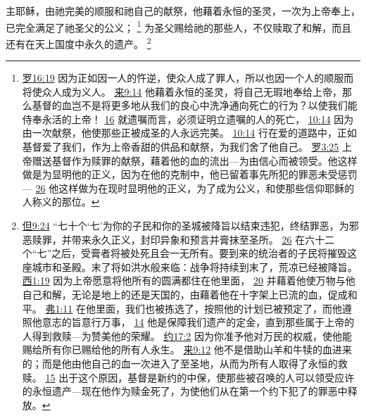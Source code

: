 \documentclass[12pt, a4paper, oneside]{ctexart}
\newcounter{parnum}[section]
\newcommand{\N}{%
   \noindent\refstepcounter{parnum}%
    \makebox[\parindent][l]{\textbf{\arabic{parnum}.}}}
\begin{document}
\N 主耶稣，由祂完美的顺服和祂自己的献祭，他藉着永恒的圣灵，一次为上帝奉上，已完全满足了祂圣父的公义；
	\footnote {
		\href{https://biblehub.com/romans/5-19.htm}{罗16:19} 因为正如因一人的忤逆，使众人成了罪人，所以也因一个人的顺服而将使众人成为义人。
		\href{https://biblehub.com/hebrews/9-14.htm}{来9:14} 他藉着永恒的圣灵，将自己无瑕地奉给上帝，那么基督的血岂不是将更多地从我们的良心中洗净通向死亡的行为？以使我们能侍奉永活的上帝！
		\href{https://biblehub.com/hebrews/9-16.htm}{16} 就遗嘱而言，必须证明立遗嘱的人的死亡，
		\href{https://biblehub.com/hebrews/10-14.htm}{10:14} 因为由一次献祭，他使那些正被成圣的人永远完美。
		\href{https://biblehub.com/ephesians/5-2.htm}{10:14} 行在爱的道路中，正如基督爱了我们，作为上帝香甜的供品和献祭，为我们舍了他自己。
		\href{https://biblehub.com/romans/3-25.htm}{罗3:25} 上帝赠送基督作为赎罪的献祭，藉着他的血的流出---为由信心而被领受。他这样做是为显明他的正义，因为在他的克制中，他已留着事先所犯的罪恶未受惩罚---
		\href{https://biblehub.com/romans/3-26.htm}{26} 他这样做为在现时显明他的正义，为了成为公义，和使那些信仰耶稣的人称义的那位。
	}
	为圣父赐给祂的那些人，不仅赎取了和解，而且还有在天上国度中永久的遗产。
	\footnote {
		\href{https://biblehub.com/daniel/9-24.htm}{但9:24} “七十个‘七’为你的子民和你的圣城被降旨以结束违犯，终结罪恶，为邪恶赎罪，并带来永久正义，封印异象和预言并膏抹至圣所。
		\href{https://biblehub.com/daniel/9-26.htm}{26} 在六十二个“七”之后，受膏者将被处死且会一无所有。要到来的统治者的子民将摧毁这座城市和圣殿。末了将如洪水般来临：战争将持续到末了，荒凉已经被降旨。
		\href{https://biblehub.com/colossians/1-19.htm}{西1:19} 因为上帝愿意将他所有的圆满都住在他里面，
		\href{https://biblehub.com/colossians/1-20.htm}{20} 并藉着他使万物与他自己和解，无论是地上的还是天国的，由藉着他在十字架上已流的血，促成和平。
		\href{https://biblehub.com/ephesians/1-11.htm}{弗1:11} 在他里面，我们也被拣选了，按照他的计划已被预定了，而他遵照他意志的旨意行万事，
		\href{https://biblehub.com/ephesians/1-14.htm}{14} 他是保障我们遗产的定金，直到那些属于上帝的人得到救赎---为赞美他的荣耀。
		\href{https://biblehub.com/john/17-2.htm}{约17:2} 因为你准予他对万民的权威，使他能赐给所有你已赐给他的所有人永生。
		\href{https://biblehub.com/hebrews/9-12.htm}{来9:12} 他不是借助山羊和牛犊的血进来的；而是他由他自己的血一次进入了至圣地，从而为所有人取得了永恒的救赎。
		\href{https://biblehub.com/hebrews/9-15.htm}{15} 出于这个原因，基督是新约的中保，使那些被召唤的人可以领受应许的永恒遗产---现在他作为赎金死了，为使他们从在第一个约下犯了的罪恶中释放。
	}
\end{document}
